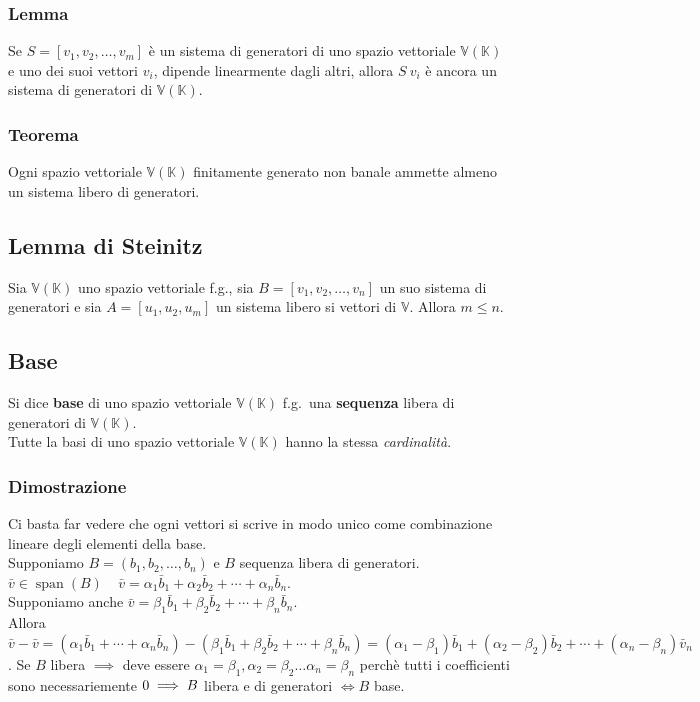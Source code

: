 \documentclass{article}
\DeclareMathOperator{\Span}{span}
\newcommand{\V}{\mathbb{V} (\mathbb{K})}
\newcommand{\s}[2]{#1_1, #1_2, \ldots, #1_{#2}}
\begin{document}
\subsubsection{Lemma}
Se $S = [\s{v}{m}]$ è un sistema di generatori di uno spazio vettoriale $\V$ e uno dei suoi vettori $v_i$, dipende linearmente dagli altri, allora
$S \ {v_i}$ è ancora un sistema di generatori di $\V$.

\subsubsection{Teorema}
Ogni spazio vettoriale $\V$ finitamente generato non banale ammette almeno un sistema libero di generatori.

\subsection{Lemma di Steinitz}
Sia $\V$ uno spazio vettoriale f.g., sia $B=[\s{v}{n}]$ un suo sistema di generatori e sia $A=[u_1,u_2,u_m]$ un sistema libero si vettori di $\mathbb V$. Allora $m\leq n$.

\subsection{Base}
Si dice \textbf{base} di uno spazio vettoriale $\V$ f.g.\ una \textbf{sequenza} libera di generatori di $\V$. \\
Tutte la basi di uno spazio vettoriale $\V$ hanno la stessa \textit{cardinalità}.

\subsubsection{Dimostrazione}
Ci basta far vedere che ogni vettori si scrive in modo unico come combinazione lineare degli elementi della base.\\
Supponiamo $B=(\s{b}{n})$ e $B$ sequenza libera di generatori.\\
$\bar v \in \Span(B) \ \ \ \ \ \bar v = \alpha_1\bar b_1+\alpha_2\bar b_2 + \cdots +\alpha_n\bar b_n$.\\
Supponiamo anche $\bar v = \beta_1\bar b_1+\beta_2\bar b_2 + \cdots +\beta_n\bar b_n$.\\
Allora $\bar v-\bar v = (\alpha_1\bar b_1+\cdots+\alpha_n\bar b_n) - (\beta_1\bar b_1+\beta_2\bar b_2 + \cdots +\beta_n\bar b_n) = (\alpha_1-\beta_1)\bar b_1+(\alpha_2-\beta_2)\bar b_2+\cdots+(\alpha_n-\beta_n)\bar v_n$.
Se $B$ libera $\implies$ deve essere $\alpha_1 = \beta_1, \alpha_2 = \beta_2 \ldots \alpha_n = \beta_n$ perchè tutti i coefficienti sono necessariemente $0\\ \implies B$ libera e di generatori $\iff B$ base.
\end{document}
